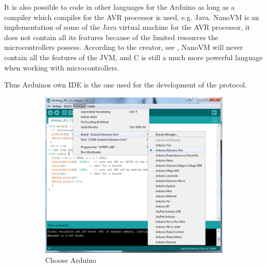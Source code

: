 It is also possible to code in other languages for the Arduino as long as a compiler which compiles for the AVR processor is used, e.g. Java.
NanoVM is an implementation of some of the Java virtual machine for the AVR processor, it does not contain all its features because of the limited resources the microcontrollers possess. 
According to the creator, see \cite{NanoVM}, NanoVM will never contain all the features of the JVM, and C is still a much more powerful language when working with microcontrollers. 

Thus Arduinos own IDE is the one used for the development of the protocol.

\begin{figure}[!ht]
    \begin{subfigure}{0.47\linewidth}
        \centering
        \includegraphics[width=\linewidth]{Figures/ChooseArduino.png}
        \caption{Choose Arduino}
        \label{fig:choose_arduino}
    \end{subfigure}\hfill
    \begin{subfigure}{0.47\linewidth}
        \centering

\end{subfigure}
\end{figure}
